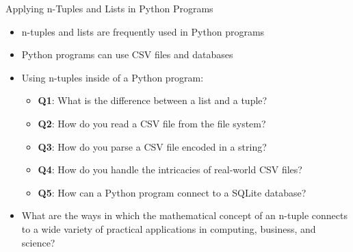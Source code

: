 \documentclass[14pt,aspectratio=169]{beamer}
\begin{document}
%
\begin{frame}{Applying n-Tuples and Lists in Python Programs}
  \begin{itemize}
    \item n-tuples and lists are frequently used in Python programs
      \vspace*{-.2in}
    \item Python programs can use CSV files and databases
      \vspace*{-.2in}
    \item Using n-tuples inside of a Python program:
      \begin{itemize}
        \item {\bf Q1}: What is the difference between a list and a tuple?
        \item {\bf Q2}: How do you read a CSV file from the file system?
        \item {\bf Q3}: How do you parse a CSV file encoded in a string?
        \item {\bf Q4}: How do you handle the intricacies of real-world CSV
          files?
        \item {\bf Q5}: How can a Python program connect to a SQLite database?
      \end{itemize}
      \vspace*{-.2in}
    \item What are the ways in which the  mathematical concept of an n-tuple
      connects to a wide variety of practical applications in computing,
      business, and science?
  \end{itemize}
\end{frame}
\end{document}
